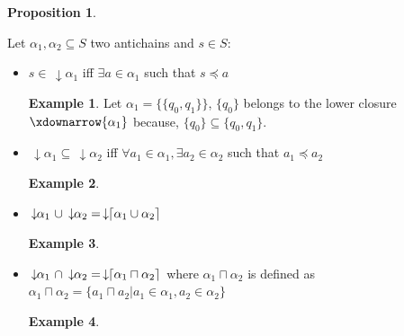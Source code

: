\documentclass[letterpaper]{article}
\DeclarePairedDelimiter{\ceil}{\lceil}{\rceil}
\newcommand{\darrow}{\, \downarrow \!\!}
\theoremstyle{definition}
\newtheorem{proposition}{Proposition}[subsection]
\newtheorem{example}{Example}[subsection]
\begin{document}
\begin{proposition}

\label{antichains_ops}

Let $\alpha_1, \alpha_2 \subseteq S$ two antichains and $s \in S$:

\begin{itemize}
    \item $s \in \darrow \alpha_1$
    iff $\exists a \in \alpha_1$ such that $s \preceq a$

    \begin{example}
        Let $\alpha_1 = \{\{q_0, q_1\}\}$, $\{q_0\}$ belongs to
        the lower closure $\xdownarrow{\alpha_1}$ because,
        $\{q_0\} \subseteq \{q_0, q_1\}$.
    \end{example}

    \item $\darrow \alpha_1 \subseteq \darrow \alpha_2$
    iff $\forall a_1 \in \alpha_1,
    \exists a_2 \in \alpha_2$ such that $a_1 \preceq a_2$
    \begin{example}

    \end{example}
    \item $ \darrow \alpha_1 \ \cup \darrow \alpha_2 =
    \darrow \ceil{\alpha_1 \cup \alpha_2}$
    \begin{example}
    \end{example}
    \item $\darrow \alpha_1 \ \cap \darrow \alpha_2 =
    \darrow \ceil{\alpha_1 \sqcap \alpha_2}$ where $\alpha_1 \sqcap \alpha_2$
    is defined as
    $\alpha_1 \sqcap \alpha_2 = \{a_1 \sqcap a_2 | a_1
    \in \alpha_1, a_2 \in \alpha_2\}$
    \begin{example}
    \end{example}


\end{itemize}

\end{proposition}



%
%
\end{document}
